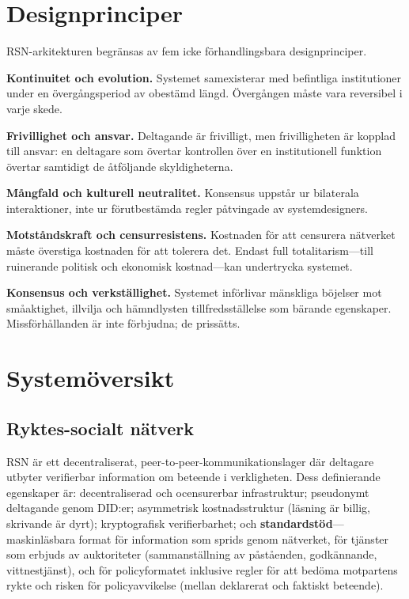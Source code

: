 \documentclass[11pt,a4paper,twocolumn]{article}
\begin{document}
\section{Designprinciper}

RSN-arkitekturen begränsas av fem icke förhandlingsbara designprinciper.

\textbf{Kontinuitet och evolution.} Systemet samexisterar med befintliga institutioner under en övergångsperiod av obestämd längd. Övergången måste vara reversibel i varje skede.

\textbf{Frivillighet och ansvar.} Deltagande är frivilligt, men frivilligheten är kopplad till ansvar: en deltagare som övertar kontrollen över en institutionell funktion övertar samtidigt de åtföljande skyldigheterna.

\textbf{Mångfald och kulturell neutralitet.} Konsensus uppstår ur bilaterala interaktioner, inte ur förutbestämda regler påtvingade av systemdesigners.

\textbf{Motståndskraft och censurresistens.} Kostnaden för att censurera nätverket måste överstiga kostnaden för att tolerera det. Endast full totalitarism---till ruinerande politisk och ekonomisk kostnad---kan undertrycka systemet.

\textbf{Konsensus och verkställighet.} Systemet införlivar mänskliga böjelser mot småaktighet, illvilja och hämndlysten tillfredsställelse som bärande egenskaper. Missförhållanden är inte förbjudna; de prissätts.

\section{Systemöversikt}

\subsection{Ryktes-socialt nätverk}

RSN är ett decentraliserat, peer-to-peer-kommunikationslager där deltagare utbyter verifierbar information om beteende i verkligheten. Dess definierande egenskaper är: decentraliserad och ocensurerbar infrastruktur; pseudonymt deltagande genom DID:er; asymmetrisk kostnadsstruktur (läsning är billig, skrivande är dyrt); kryptografisk verifierbarhet; och \textbf{standardstöd}---maskinläsbara format för information som sprids genom nätverket, för tjänster som erbjuds av auktoriteter (sammanställning av påståenden, godkännande, vittnestjänst), och för policyformatet inklusive regler för att bedöma motpartens rykte och risken för policyavvikelse (mellan deklarerat och faktiskt beteende).
\end{document}
